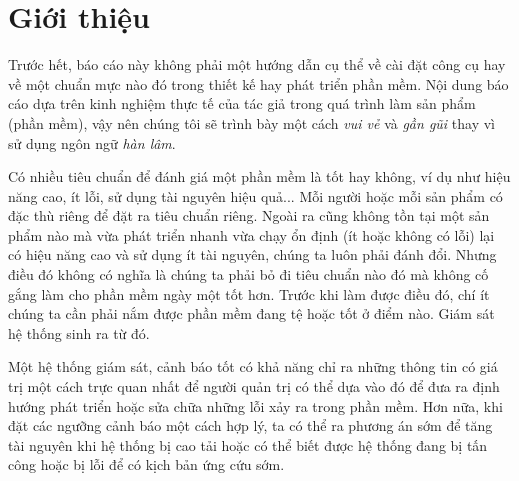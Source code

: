 \chapter{Giới thiệu}
Trước hết, báo cáo này không phải một hướng dẫn cụ thể về cài đặt công cụ hay về một chuẩn mực nào đó trong thiết kế hay phát triển phần mềm. Nội dung báo cáo dựa trên kinh nghiệm thực tế của tác giả trong quá trình làm sản phẩm (phần mềm), vậy nên chúng tôi sẽ trình bày một cách \textit{vui vẻ} và \textit{gần gũi} thay vì sử dụng ngôn ngữ \textit{hàn lâm}.

Có nhiều tiêu chuẩn để đánh giá một phần mềm là tốt hay không, ví dụ như hiệu năng cao, ít lỗi, sử dụng tài nguyên hiệu quả... Mỗi người hoặc mỗi sản phẩm có đặc thù riêng để đặt ra tiêu chuẩn riêng. Ngoài ra cũng không tồn tại một sản phẩm nào mà vừa phát triển nhanh vừa chạy ổn định (ít hoặc không có lỗi) lại có hiệu năng cao và sử dụng ít tài nguyên, chúng ta luôn phải đánh đổi. Nhưng điều đó không có nghĩa là chúng ta phải bỏ đi tiêu chuẩn nào đó mà không cố gắng làm cho phần mềm ngày một tốt hơn. Trước khi làm được điều đó, chí ít chúng ta cần phải nắm được phần mềm đang tệ hoặc tốt ở điểm nào. Giám sát hệ thống sinh ra từ đó. 

Một hệ thống giám sát, cảnh báo tốt có khả năng chỉ ra những thông tin có giá trị một cách trực quan nhất để người quản trị có thể dựa vào đó để đưa ra định hướng phát triển hoặc sửa chữa những lỗi xảy ra trong phần mềm. Hơn nữa, khi đặt các ngưỡng cảnh báo một cách hợp lý, ta có thể ra phương án sớm để tăng tài nguyên khi hệ thống bị cao tải hoặc có thể biết được hệ thống đang bị tấn công hoặc bị lỗi để có kịch bản ứng cứu sớm. 